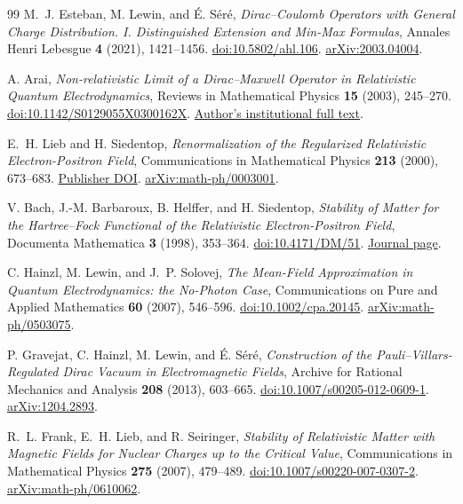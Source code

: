 \begin{thebibliography}{99}
M.~J. Esteban, M. Lewin, and \'{E}. S\'er\'e,
\emph{Dirac--Coulomb Operators with General Charge Distribution. I. Distinguished Extension and Min-Max Formulas},
Annales Henri Lebesgue \textbf{4} (2021), 1421--1456.
\href{https://doi.org/10.5802/ahl.106}{doi:10.5802/ahl.106}.
\href{https://arxiv.org/abs/2003.04004}{arXiv:2003.04004}.

A. Arai,
\emph{Non-relativistic Limit of a Dirac--Maxwell Operator in Relativistic Quantum Electrodynamics},
Reviews in Mathematical Physics \textbf{15} (2003), 245--270.
\href{https://doi.org/10.1142/S0129055X0300162X}{doi:10.1142/S0129055X0300162X}.
\href{https://eprints.lib.hokudai.ac.jp/repo/huscap/all/38264/DM.pdf}{Author's institutional full text}.

E.~H. Lieb and H. Siedentop,
\emph{Renormalization of the Regularized Relativistic Electron-Positron Field},
Communications in Mathematical Physics \textbf{213} (2000), 673--683.
\href{https://doi.org/10.1007/s002200000265}{Publisher DOI}.
\href{https://arxiv.org/abs/math-ph/0003001}{arXiv:math-ph/0003001}.

V. Bach, J.-M. Barbaroux, B. Helffer, and H. Siedentop,
\emph{Stability of Matter for the Hartree--Fock Functional of the Relativistic Electron-Positron Field},
Documenta Mathematica \textbf{3} (1998), 353--364.
\href{https://doi.org/10.4171/DM/51}{doi:10.4171/DM/51}.
\href{https://ems.press/journals/dm/articles/8964982}{Journal page}.

C. Hainzl, M. Lewin, and J.~P. Solovej,
\emph{The Mean-Field Approximation in Quantum Electrodynamics: the No-Photon Case},
Communications on Pure and Applied Mathematics \textbf{60} (2007), 546--596.
\href{https://doi.org/10.1002/cpa.20145}{doi:10.1002/cpa.20145}.
\href{https://arxiv.org/abs/math-ph/0503075}{arXiv:math-ph/0503075}.

P. Gravejat, C. Hainzl, M. Lewin, and \'E. S\'er\'e,
\emph{Construction of the Pauli--Villars-Regulated Dirac Vacuum in Electromagnetic Fields},
Archive for Rational Mechanics and Analysis \textbf{208} (2013), 603--665.
\href{https://doi.org/10.1007/s00205-012-0609-1}{doi:10.1007/s00205-012-0609-1}.
\href{https://arxiv.org/abs/1204.2893}{arXiv:1204.2893}.

R.~L. Frank, E.~H. Lieb, and R. Seiringer,
\emph{Stability of Relativistic Matter with Magnetic Fields for Nuclear Charges up to the Critical Value},
Communications in Mathematical Physics \textbf{275} (2007), 479--489.
\href{https://doi.org/10.1007/s00220-007-0307-2}{doi:10.1007/s00220-007-0307-2}.
\href{https://arxiv.org/abs/math-ph/0610062}{arXiv:math-ph/0610062}.


\end{thebibliography}
